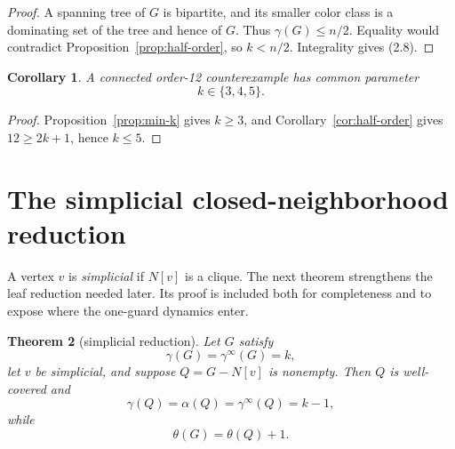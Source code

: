 \documentclass[11pt]{article}
\newtheorem{theorem}{Theorem}[section]
\newtheorem{corollary}[theorem]{Corollary}
\theoremstyle{definition}
\theoremstyle{remark}
\newcommand{\gaminf}{\gamma^{\infty}}
\begin{document}
\begin{proof}
A spanning tree of \(G\) is bipartite, and its smaller color class is a
dominating set of the tree and hence of \(G\).  Thus
\(\gamma(G)\leq n/2\).  Equality would contradict
Proposition~\ref{prop:half-order}, so \(k<n/2\).  Integrality gives (2.8).
\end{proof}

\begin{corollary}\label{cor:parameters}
A connected order-12 counterexample has common parameter
\[
  k\in\{3,4,5\}.
\tag{2.9}
\]
\end{corollary}

\begin{proof}
Proposition~\ref{prop:min-k} gives \(k\geq3\), and
Corollary~\ref{cor:half-order} gives \(12\geq2k+1\), hence \(k\leq5\).
\end{proof}

\section{The simplicial closed-neighborhood reduction}
\label{sec:simplicial}

A vertex \(v\) is \emph{simplicial} if \(N[v]\) is a clique.  The next
theorem strengthens the leaf reduction needed later.  Its proof is included
both for completeness and to expose where the one-guard dynamics enter.

\begin{theorem}[simplicial reduction]\label{thm:simplicial}
Let \(G\) satisfy
\[
  \gamma(G)=\gaminf(G)=k,
\]
let \(v\) be simplicial, and suppose \(Q=G-N[v]\) is nonempty.  Then \(Q\)
is well-covered and
\[
  \gamma(Q)=\alpha(Q)=\gaminf(Q)=k-1,
\tag{3.1}
\]
while
\[
  \theta(G)=\theta(Q)+1.
\tag{3.2}
\]
\end{theorem}
\end{document}
